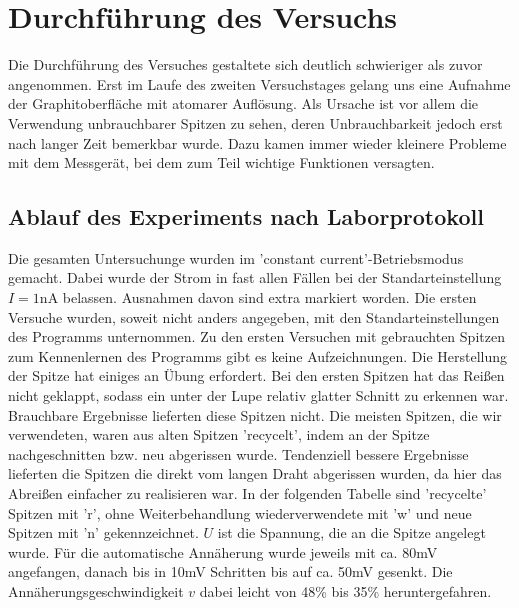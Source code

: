 \section{Durchführung des Versuchs}

Die Durchführung des Versuches gestaltete sich deutlich schwieriger als zuvor angenommen. 
Erst im Laufe des zweiten Versuchstages gelang uns eine Aufnahme der Graphitoberfläche mit 
atomarer Auflösung. Als Ursache ist vor allem die Verwendung unbrauchbarer Spitzen zu sehen, 
deren Unbrauchbarkeit jedoch erst nach langer Zeit bemerkbar wurde. Dazu kamen immer wieder 
kleinere Probleme mit dem Messgerät, bei dem zum Teil wichtige Funktionen versagten. 

\subsection{Ablauf des Experiments nach Laborprotokoll}
Die gesamten Untersuchunge wurden im 'constant current'-Betriebsmodus gemacht. Dabei wurde 
der Strom in fast allen Fällen bei der Standarteinstellung $I = 1\mathrm{nA}$ belassen. 
Ausnahmen davon sind extra markiert worden. 
Die ersten Versuche wurden, soweit nicht anders angegeben,  mit den Standarteinstellungen 
des Programms unternommen. Zu den ersten Versuchen mit gebrauchten Spitzen zum Kennenlernen 
des Programms gibt es keine Aufzeichnungen.
Die Herstellung der Spitze hat einiges an Übung erfordert. Bei den ersten Spitzen hat das 
Reißen nicht geklappt, sodass ein unter der Lupe relativ glatter Schnitt zu erkennen war. 
Brauchbare Ergebnisse lieferten diese Spitzen nicht. Die meisten Spitzen, die wir verwendeten, 
waren aus alten Spitzen 'recycelt', indem an der Spitze nachgeschnitten bzw. neu abgerissen 
wurde. Tendenziell bessere Ergebnisse lieferten die Spitzen die direkt vom langen Draht 
abgerissen wurden, da hier das Abreißen einfacher zu realisieren war. In der folgenden Tabelle 
sind 'recycelte' Spitzen mit 'r', ohne Weiterbehandlung wiederverwendete mit 
'w' und neue Spitzen mit 'n' gekennzeichnet. $U$ ist die Spannung, die an die Spitze angelegt 
wurde. Für die automatische Annäherung wurde jeweils mit ca. 80mV angefangen, danach bis 
in 10mV Schritten bis auf ca. 50mV gesenkt. Die Annäherungsgeschwindigkeit $v$ dabei leicht 
von 48\% bis 35\% heruntergefahren. 
\\\\
